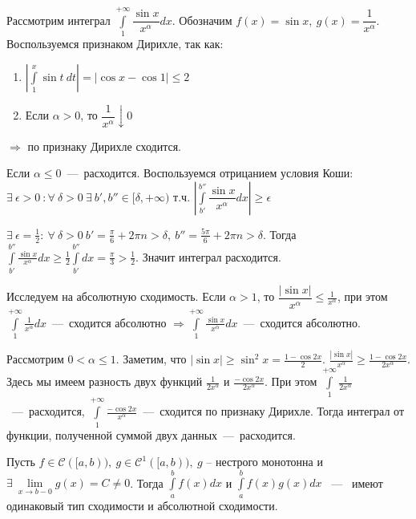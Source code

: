 \begin{example}
    Рассмотрим интеграл $\int\limits_{1}^{+\infty} \dfrac{\sin x}{x^{\alpha}} dx $. Обозначим $f(x) = \sin x, \ g(x) = \dfrac{1}{x^{\alpha}}$. Воспользуемся признаком Дирихле, так как:
    \begin{enumerate}
        \item $ \left | \int \limits_{1}^{x} \sin t \ dt \right | = | \cos x - \cos 1 | \le 2 $
        \item Если $\alpha > 0$, то $\dfrac{1}{x^{\alpha}} \downarrow 0$
    \end{enumerate}
    $\Rightarrow$ по признаку Дирихле сходится. 

    \noindent Если $\alpha \le 0$~---~расходится. Воспользуемся отрицанием условия Коши: $\exists \ \epsilon > 0 \ : \forall \ \delta > 0 \ \exists \ b', b'' \in [\delta, + \infty) \text{ т.ч. } \left | \int \limits_{b'}^{b''} \dfrac{\sin x}{x^{\alpha}} dx \right | \ge \epsilon$

    \noindent $\exists \ \epsilon = \frac{1}{2} : \ \forall \ \delta > 0 \ b' = \frac{\pi}{6} + 2 \pi n > \delta, \ b'' = \frac{5\pi}{6} + 2\pi n > \delta$. Тогда $\int\limits_{b'}^{b''} \frac{\sin x}{x^{\alpha}} dx \ge \frac{1}{2} \int\limits_{b'}^{b''} dx = \frac{\pi}{3} > \frac{1}{2}$. Значит интеграл расходится. 

    \noindent Исследуем на абсолютную сходимость. Если $\alpha > 1$, то $\dfrac{|\sin x|}{x^{\alpha}} \le \frac{1}{x^{\alpha}}$, при этом $\int\limits_{1}^{+\infty} \frac{1}{x^{\alpha}} dx$~---~сходится абсолютно $\Rightarrow \int\limits_{1}^{+\infty} \frac{\sin x}{x^{\alpha}} dx$~---~сходится абсолютно. 

    \noindent Рассмотрим $0 < \alpha \le 1$. Заметим, что $|\sin x| \ge \sin^2 x = \frac{1 - \cos 2x}{2}$. $\frac{|\sin x|}{x^{\alpha}} \ge \frac{1 - \cos 2x}{2x^{\alpha}}$. Здесь мы имеем разность двух функций $\frac{1}{2x^{\alpha}}$ и $\frac{-\cos 2x}{2x^{\alpha}}$. При этом $\int\limits_{1}^{+\infty} \frac{1}{2x^{\alpha}}$~---~расходится, $\int\limits_{1}^{+\infty} \frac{-\cos 2x}{x^{\alpha}}$~---~сходится по признаку Дирихле. Тогда интеграл от функции, полученной суммой двух данных~---~расходится. 
\end{example}

\begin{corollary}
     Пусть $f \in \mathcal{C}([a, b)), \ g \in \mathcal{C}^1([a, b)), \ g$ -- нестрого монотонна и $\exists \ \lim\limits_{x \rightarrow b-0} g(x) = C \neq 0$. Тогда $\int \limits_{a}^{b} f(x) dx$ и $\int\limits_{a}^{b}f(x)g(x) dx$ ~---~ имеют одинаковый тип сходимости и абсолютной сходимости. 
\end{corollary}

